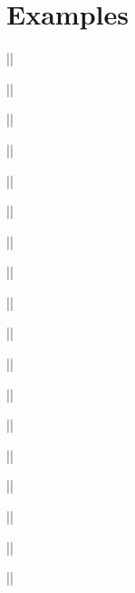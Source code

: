 \documentclass[11pt]{article}
\begin{document}
\section{Examples}
\begin{multicols}{3}
||


||


||

\end{multicols}
\begin{multicols}{3}
||


||


||


\end{multicols}
\xslottrue
\begin{multicols}{3}
||


||


||

\end{multicols}
\clearpage
\begin{multicols}{3}
||


||


||

\end{multicols}
\begin{multicols}{3}
||


||


||

\end{multicols}
\begin{multicols}{3}
||


||


||

\end{multicols}
\end{document}
